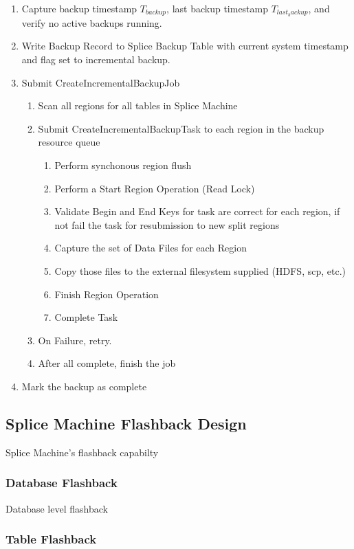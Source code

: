\begin{enumerate}
	\item Capture backup timestamp $T_{backup}$, last backup
	timestamp $T_{last_backup}$, and verify no active backups running.
	\item Write Backup Record to Splice Backup Table with current system timestamp
	and flag set to incremental backup.
	\item Submit CreateIncrementalBackupJob 
	\begin{enumerate}
	\item Scan all regions for all tables in Splice Machine
	\item Submit CreateIncrementalBackupTask to each region in the backup resource
	queue
	\begin{enumerate}
	\item Perform synchonous region flush 
	\item Perform a Start Region Operation (Read Lock)
	\item Validate Begin and End Keys for task are correct for each region, if not
	fail the task for resubmission to new split regions
	\item Capture the set of Data Files for each Region
	\item Copy those files to the external filesystem supplied (HDFS, scp, etc.)
	\item Finish Region Operation
	\item Complete Task
	\end{enumerate}
	\item On Failure, retry.
	\item After all complete, finish the job
	\end{enumerate}
	\item Mark the backup as complete
\end{enumerate}

\subsection{Splice Machine Flashback Design}
Splice Machine's flashback capabilty

\subsubsection{Database Flashback}
Database level flashback



\subsubsection{Table Flashback}


